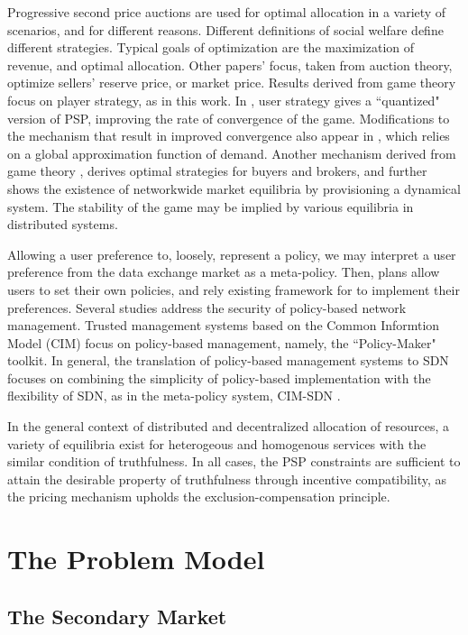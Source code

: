 Progressive second price auctions are used for optimal allocation in a
variety of scenarios, and for different reasons. Different definitions of social
welfare define different strategies. Typical goals of optimization are the
maximization of revenue, and optimal allocation. Other papers' focus, taken from
auction theory, optimize sellers' reserve price, or market price. Results derived from game theory
focus on player strategy, as in this work. In \cite{qpsp}, user strategy gives a ``quantized"
version of PSP, improving the rate of convergence of the game. Modifications to
the mechanism that result in improved convergence also appear in \cite{burst},
which relies on a global approximation function of demand.
Another mechanism derived from game theory \cite{diffserve}, derives
optimal strategies for buyers and brokers, and further shows the existence
of networkwide market equilibria by provisioning a dynamical system. The stability
of the game may be implied by various equilibria in distributed systems.

Allowing a user preference to, loosely, represent a policy, we may interpret
a user preference from the data exchange market as a meta-policy. Then,  plans allow users to set their own policies, and rely existing
framework for to implement their preferences. Several studies address the
security of policy-based network management.
Trusted management systems based on the
Common Informtion Model (CIM) focus on policy-based management, namely,
the ``Policy-Maker" toolkit. 
In general, the translation of policy-based management systems to SDN focuses on combining
the simplicity of policy-based implementation with the flexibility of SDN, as in the
meta-policy system, CIM-SDN \cite{meta}.

In the general context of distributed and decentralized allocation of
resources, a variety of equilibria exist for heterogeous and homogenous services
with the similar condition of truthfulness. In all cases, the PSP constraints are
sufficient to attain the desirable property of truthfulness through incentive
compatibility, as the pricing mechanism upholds the exclusion-compensation
principle.

\section{The Problem Model}

\subsection{The Secondary Market}

